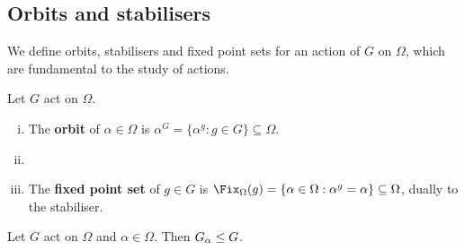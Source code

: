 
\subsection{Orbits and stabilisers}

We define orbits, stabilisers and fixed point sets for an action of $G$ on $\Omega$, which are fundamental to the study of actions.

\begin{definition}\label{def:orbit_stabiliser}
    Let $G$ act on $\Omega$.
    \begin{enumerate}[(i)]
        \item The \textbf{orbit} of $\alpha \in \Omega$ is $\alpha^G = \{\alpha^g : g \in G\} \subseteq \Omega$.
        \item {}
        \item The \textbf{fixed point set} of $g \in G$ is $\Fix_\Omega(g) = \{\alpha \in \Omega : \alpha^g = \alpha\} \subseteq \Omega$, dually to the stabiliser.
    \end{enumerate}
\end{definition}


\begin{proposition}\label{prop:stabiliser_subgroup}
    Let $G$ act on $\Omega$ and $\alpha \in \Omega$. Then $\added{2}{G_\alpha} \leq G$.
\end{proposition}

